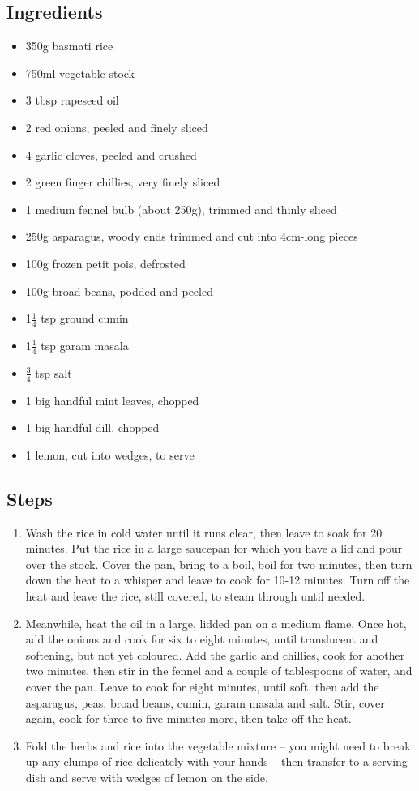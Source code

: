 \documentclass{book}
\begin{document}
\subsection*{Ingredients}
\begin{itemize}
\item 350g basmati rice
\item 750ml vegetable stock
\item 3 tbsp rapeseed oil 
\item 2 red onions, peeled and finely sliced
\item 4 garlic cloves, peeled and crushed
\item 2 green finger chillies, very finely sliced
\item 1 medium fennel bulb (about 250g), trimmed and thinly sliced
\item 250g asparagus, woody ends trimmed and cut into 4cm-long pieces
\item 100g frozen petit pois, defrosted 
\item 100g broad beans, podded and peeled
\item 1$\frac{1}{4}$ tsp ground cumin
\item 1$\frac{1}{4}$ tsp garam masala
\item $\frac{3}{4}$ tsp salt
\item 1 big handful mint leaves, chopped
\item 1 big handful dill, chopped
\item 1 lemon, cut into wedges, to serve
\end{itemize}

\subsection*{Steps}
\begin{enumerate}
\item Wash the rice in cold water until it runs clear, then leave to soak for 20 minutes. Put the rice in a large saucepan for which you have a lid and pour over the stock. Cover the pan, bring to a boil, boil for two minutes, then turn down the heat to a whisper and leave to cook for 10-12 minutes. Turn off the heat and leave the rice, still covered, to steam through until needed.
\item Meanwhile, heat the oil in a large, lidded pan on a medium flame. Once hot, add the onions and cook for six to eight minutes, until translucent and softening, but not yet coloured. Add the garlic and chillies, cook for another two minutes, then stir in the fennel and a couple of tablespoons of water, and cover the pan. Leave to cook for eight minutes, until soft, then add the asparagus, peas, broad beans, cumin, garam masala and salt. Stir, cover again, cook for three to five minutes more, then take off the heat.
\item Fold the herbs and rice into the vegetable mixture – you might need to break up any clumps of rice delicately with your hands – then transfer to a serving dish and serve with wedges of lemon on the side.
\end{enumerate}
\newpage
\end{document}
